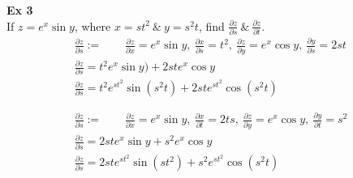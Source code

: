 \documentclass{article}
\begin{document}
  \textbf{Ex 3}\\
  If $ z=e^{x}\sin{y} $, where $ x=st^{2}  ~\&~ y=s^{2}t $, find $ \frac{\partial z}{\partial s} ~\&~ \frac{\partial z}{\partial t}  $.
  \[
    \begin{gathered}
      \frac{\partial z}{\partial s}:= \qquad \frac{\partial z}{\partial x}=e^{x}\sin{y},~\frac{\partial x}{\partial s}=t^{2},~\frac{\partial z}{\partial y}=e^{x}\cos{y},~\frac{\partial y}{\partial s}=2st\\
    \frac{\partial z}{\partial s}= t^{2} e^{x}\sin{y} )+2ste^{x}\cos{y}\\
    \boxed{\frac{\partial z}{\partial s} = t^{2}e^{st^{2}}\sin{(s^{2}t)} + 2st e^{st^{2} }\cos{(s^{2}t)}}\\
    ~\\
    ~\\
    \frac{\partial z}{\partial s} := \qquad \frac{\partial z}{\partial x}=e^{x}\sin{y},~\frac{\partial x}{\partial t}=2ts,~\frac{\partial z}{\partial y}=e^{x}\cos{y},~\frac{\partial y}{\partial t}=s^{2}\\
    \frac{\partial z}{\partial s}=2ste^{x}\sin{y}+s^{2}e^{x}\cos{y}\\
    \boxed{\frac{\partial z}{\partial s}= 2ste^{st^{2}}\sin{(st^{2})}+s^{2}e^{st^{2}}\cos{(s^{2}t)}}      
    \end{gathered}
  \]
  
  
  
\end{document}
